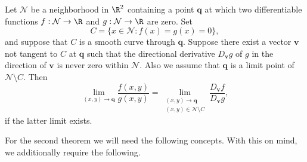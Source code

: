 \begin{thm} \label{thm:Lawlor}
	Let $\mathcal{N}$ be a neighborhood in $\R^2$ containing a point $\mathbf{q}$ at which
	two differentiable functions $f:\mathcal{N}\to \R$ and $g:\mathcal{N}\to \R$ are zero.
	Set 
	$$
		C=\{x \in \mathcal{N}: f(x)=g(x)=0 \},
	$$
	and suppose that $C$ is a smooth curve through $\mathbf{q}$.
	Suppose	there exist a vector $\mathbf{v}$ not tangent to $C$ at $\mathbf{q}$
	such that the directional derivative $D_{\mathbf{v}}g$ of $g$ in the direction of $\mathbf{v}$ is never zero
	within $\mathcal{N}$. Also we assume that $\mathbf{q}$ is a limit point of $\mathcal{N}\setminus C$. Then
	\begin{equation*}
		\lim_{(x,y)\to \mathbf{q}}
		\frac{f(x,y)}{g(x,y)} =
		\lim_{
				\substack{
					(x,y)\to \mathbf{q}\\ 
					(x,y)\in \mathcal{N} \setminus C
				}
		}
		\frac{D_{\mathbf{v}} f }{D_{\mathbf{v}} g},
	\end{equation*}
	if the latter limit exists.
\end{thm}
For the second theorem we will need the following concepts.
%
With this on mind, we additionally require the following. 

